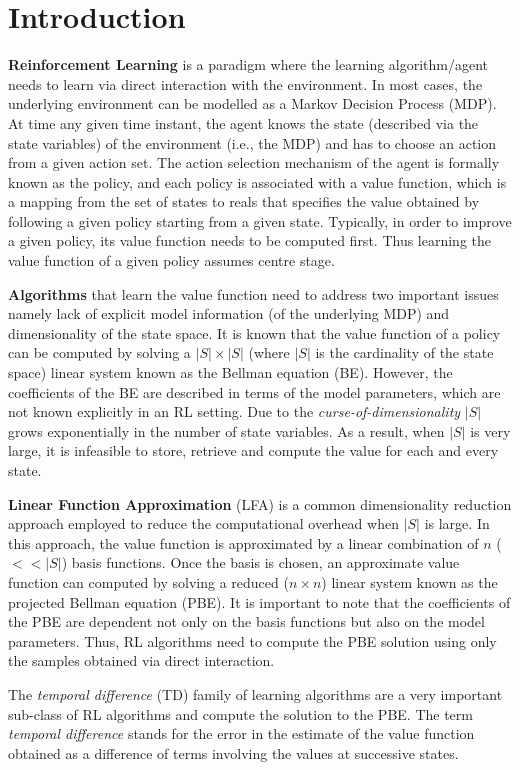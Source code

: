 \section{Introduction}
\textbf{Reinforcement Learning} is a paradigm where the learning algorithm/agent needs to learn via direct interaction with the environment. In most cases, the underlying environment can be modelled as a Markov Decision Process (MDP). At time any given time instant, the agent knows the state (described via the state variables) of the environment (i.e., the MDP) and has to choose an action from a given action set. The action selection mechanism of the agent is formally known as the policy, and each policy is associated with a value function, which is a mapping from the set of states to reals that specifies the value obtained by following a given policy starting from a given state. Typically, in order to improve a given policy, its value function needs to be computed first. Thus learning the value function of a given policy assumes centre stage.\par
\textbf{Algorithms} that learn the value function need to address two important issues namely lack of explicit model information (of the underlying MDP) and dimensionality of the state space. It is known that the value function of a policy can be computed by solving a $|S|\times|S|$ (where $|S|$ is the cardinality of the state space) linear system known as the Bellman equation (BE). However, the coefficients of the BE are described in terms of the model parameters, which are not known explicitly in an RL setting. Due to the \emph{curse-of-dimensionality} $|S|$ grows exponentially in the number of state variables. As a result, when $|S|$ is very large, it is infeasible to store, retrieve and compute the value for each and every state.\par
\textbf{Linear Function Approximation} (LFA) is a common dimensionality reduction approach employed to reduce the computational overhead when $|S|$ is large. In this approach, the value function is approximated by a linear combination of $n$ ($<<|S|$) basis functions. Once the basis is chosen, an approximate value function can computed by solving a reduced ($n\times n$) linear system known as the projected Bellman equation (PBE). It is important to note that the coefficients of the PBE are dependent not only on the basis functions but also on the model parameters. Thus, RL algorithms need to compute the PBE solution using only the samples obtained via direct interaction.\par
The \emph{temporal difference} (TD) family of learning algorithms are a very important sub-class of RL algorithms and compute the solution to the PBE. The term \emph{temporal difference} stands for the  error in the estimate of the value function obtained as a difference of terms involving the values at successive states. 
